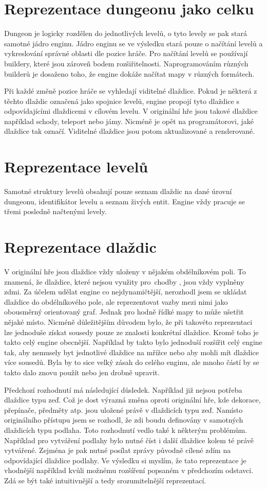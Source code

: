 \section{Reprezentace dungeonu jako celku}
Dungeon je logicky rozdělen do jednotlivých levelů, o tyto levely se pak stará samotné jádro enginu. Jádro enginu se ve výsledku stará
pouze o načítání levelů a vykreslování správné oblasti dle pozice hráče. Pro načítání levelů se používají buildery, které jsou zároveň
bodem rozšiřitelnosti. Naprogramováním různých builderů je dosaženo toho, že engine dokáže načítat mapy v různých formátech.

Při každé změně pozice hráče se vyhledají viditelné dlaždice. Pokud je některá z těchto dlaždic označená jako spojnice levelů,
engine propojí tyto dlaždice s odpovídajícími dlaždicemi v cílovém levelu. V originální hře jsou takové dlaždice například schody,
teleport nebo jámy. Nicméně je opět na programátorovi, jaké dlaždice tak označí. Viditelné dlaždice jsou potom aktualizované a renderované.

\section{Reprezentace levelů}
Samotné struktury levelů obsahují pouze seznam dlaždic na dané úrovní dungeonu, identifikátor levelu a seznam živých entit. 
Engine vždy pracuje se třemi posledně načtenými levely.

\section{Reprezentace dlaždic} 
V originální hře jsou dlaždice vždy uloženy v nějakém obdélníkovém poli. To znamená, že dlaždice, které nejsou využity pro~chodby
, jsou vždy vyplněny zdmi. Za účelem udělat engine co nejdynamičtější, nerozhodl jsem se ukládat dlaždice
do obdélníkového pole, ale reprezentovat vazby mezi nimi jako obousměrný orientovaný graf. Jednak pro hodně řídké mapy to může
ušetřit nějaké místo. Nicméně důležitějším důvodem bylo, že při takovéto reprezentaci lze jednoduše získat sousedy pouze
ze znalosti konkrétní dlaždice. Kromě toho je takto celý engine obecnější. Například by takto bylo jednoduší rozšířit celý engine
tak, aby nemusely byt jednotlivé dlaždice na mřížce nebo aby mohli mít dlaždice více sousedů. Byla by to sice velký zásah do celého 
enginu, ale mnoho částí by se takto dalo znovu použít nebo jen drobně upravit.

Předchozí rozhodnutí má následující důsledek. Například již nejsou potřeba dlaždice typu zeď.
Což je dost výrazná změna oproti originální hře, kde dekorace, přepínače, předměty atp. jsou uložené právě v dlaždicích typu zeď.
Namísto originálního přístupu jsem se rozhodl, že zdi boudu definovány v samotných dlaždicích typu podlaha. Toto rozhodnutí vedlo také
k některým problémům. Například pro vytváření podlahy bylo nutné číst i další dlaždice kolem té právě vytvářené. Zejména je pak nutné 
posílat zprávy původně cílené zdím na odpovídající dlaždice podlahy. Ve výsledku si myslím, že tato reprezentace je vhodnější
například kvůli možnému rozšíření popsaném v předchozím odstavci. Zdá se být také intuitivnější a tedy srozumitelnější reprezentací.

